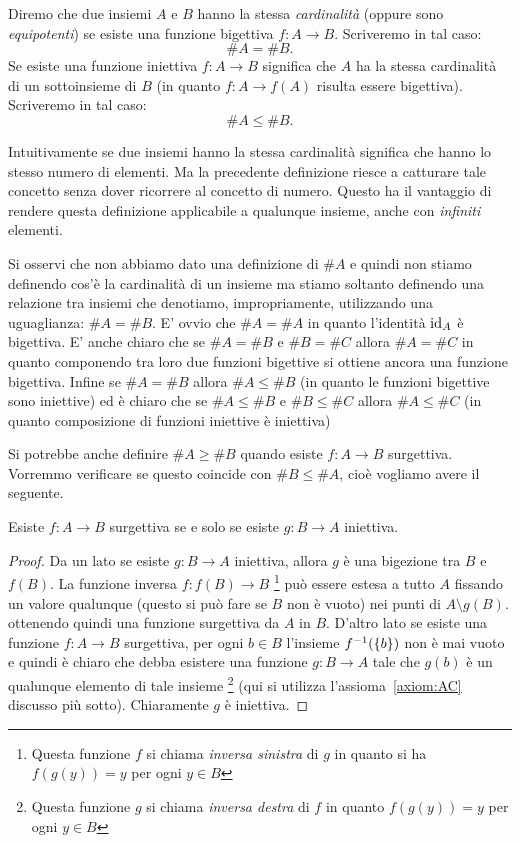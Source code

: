 \begin{definition}[cardinalità]
  Diremo che due insiemi $A$ e $B$ hanno la stessa \emph{cardinalità}%
%
  (oppure sono \emph{equipotenti}) 
  se esiste una funzione bigettiva $f\colon A \to B$.
  Scriveremo in tal caso:
  \[
    \# A = \# B.  
  \] 
  Se esiste una funzione iniettiva $f\colon A\to B$ significa che 
  $A$ ha la stessa cardinalità di un sottoinsieme di $B$ (in quanto $f\colon A \to f(A)$
  risulta essere bigettiva). Scriveremo in tal caso:
  \[
    \# A \le \#B.
  \]
\end{definition}

Intuitivamente se due insiemi hanno la stessa cardinalità 
significa che hanno lo stesso numero di elementi.
Ma la precedente definizione riesce a catturare tale concetto senza dover 
ricorrere al concetto di numero. 
Questo ha il vantaggio di rendere questa definizione applicabile 
a qualunque insieme, anche con \emph{infiniti} elementi.

Si osservi che non abbiamo dato una definizione di $\#A$ e quindi non stiamo 
definendo cos'è la cardinalità di un insieme ma stiamo soltanto definendo 
una relazione tra insiemi che 
denotiamo, impropriamente, utilizzando una uguaglianza: $\#A = \#B$.
E' ovvio che $\#A = \#A$ in quanto l'identità $\mathrm{id}_A$ è bigettiva.
E' anche chiaro che se $\#A = \#B$ e $\#B = \#C$ allora $\#A = \#C$ in quanto 
componendo tra loro due funzioni bigettive si ottiene ancora una funzione 
bigettiva. 
Infine se $\#A = \#B$ allora $\#A \le \#B$ (in quanto le funzioni bigettive 
sono iniettive) ed è chiaro che se $\#A \le \#B$ e $\#B \le \#C$ allora 
$\#A\le \#C$ (in quanto composizione di funzioni iniettive è iniettiva)

Si potrebbe anche definire $\#A \ge \#B$ quando esiste $f\colon A \to B$
surgettiva. Vorremmo verificare se questo coincide con $\#B \le \#A$, 
cioè vogliamo avere il seguente.
%
\begin{theorem}\label{th:95444}
  Esiste $f\colon A\to B$ surgettiva 
  se e solo se esiste $g\colon B\to A$ iniettiva.
\end{theorem}
% 
\begin{proof}
Da un lato se esiste $g\colon B\to A$ iniettiva, allora $g$ è una bigezione 
tra $B$ e $f(B)$. La funzione inversa $f\colon f(B) \to B$ 
\footnote{Questa funzione $f$ si chiama 
\emph{inversa sinistra}
%
di $g$ in quanto si ha $f(g(y))=y$ per ogni $y\in B$}
può essere estesa a tutto $A$ fissando un valore qualunque 
(questo si può fare se $B$ non è vuoto) nei punti di $A\setminus g(B)$.
ottenendo quindi una funzione surgettiva da $A$ in $B$.
D'altro lato se esiste una funzione $f\colon A\to B$ surgettiva,
per ogni $b\in B$ l'insieme $f^{-1}({\left\{ b \right\}})$ non è mai 
vuoto e quindi è chiaro che debba esistere 
una funzione $g\colon B\to A$ tale che $g(b)$ è un qualunque elemento 
di tale insieme
\footnote{Questa funzione $g$ si chiama 
\emph{inversa destra} 
%
di $f$ 
in quanto $f(g(y))=y$ per ogni $y\in B$}
(qui si utilizza l'assioma~\ref{axiom:AC} discusso più sotto). 
Chiaramente $g$ è iniettiva.
\end{proof}

